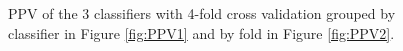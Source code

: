 \documentclass[11pt]{article}
\begin{document}
	\begin{figure}[H]%
		\centering
		\caption{\footnotesize PPV of the 3 classifiers with 4-fold cross validation grouped by classifier in Figure \ref{fig:PPV1}  and  by fold in Figure \ref{fig:PPV2}. }
		\label{fig:RealPPV}
	\end{figure}
	
\end{document}
